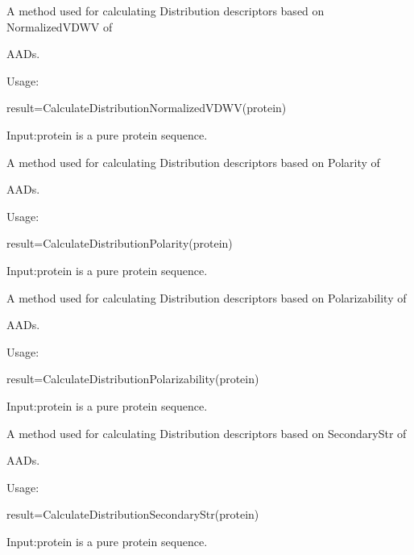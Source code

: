 \documentclass[letterpaper,10pt,english]{sphinxmanual}
\begin{document}
\begin{fulllineitems}
\label{reference/CTD:CTD.CalculateDistributionNormalizedVDWV}
A method used for calculating Distribution descriptors based on NormalizedVDWV of

AADs.

Usage:

result=CalculateDistributionNormalizedVDWV(protein)

Input:protein is a pure protein sequence.

\end{fulllineitems}


\begin{fulllineitems}
\label{reference/CTD:CTD.CalculateDistributionPolarity}
A method used for calculating Distribution descriptors based on Polarity of

AADs.

Usage:

result=CalculateDistributionPolarity(protein)

Input:protein is a pure protein sequence.

\end{fulllineitems}


\begin{fulllineitems}
\label{reference/CTD:CTD.CalculateDistributionPolarizability}
A method used for calculating Distribution descriptors based on Polarizability of

AADs.

Usage:

result=CalculateDistributionPolarizability(protein)

Input:protein is a pure protein sequence.

\end{fulllineitems}


\begin{fulllineitems}
\label{reference/CTD:CTD.CalculateDistributionSecondaryStr}
A method used for calculating Distribution descriptors based on SecondaryStr of

AADs.

Usage:

result=CalculateDistributionSecondaryStr(protein)

Input:protein is a pure protein sequence.

\end{fulllineitems}
\end{document}
